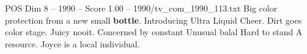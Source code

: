\begin{textsample}{POS Dim 8 – 1990 – Score 1.00 – 1990/tv\_com\_1990\_113.txt}  \label{ex:f8_pos_074}
Big color protection from a new small \textbf{bottle}.
Introducing Ultra Liquid Cheer.
Dirt goes color stage.
Juicy nooit.
Concerned by constant Unusual balal Hard to stand A resource.
Joyce is a local individual.

\end{textsample}
